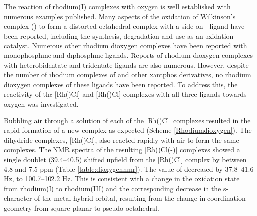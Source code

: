 The reaction of rhodium(I) complexes with oxygen is well established with numerous examples published.\cite{Valentine1973, Choy1972}  Many aspects of the oxidation of Wilkinson's complex () to form a distorted octahedral complex with a side-on - ligand have been reported, including the synthesis\cite{Baird1966, Atlay1980}, degradation\cite{Atlay1983} and use as an oxidation catalyst.\cite{Carlton1983, Read1985}  Numerous other rhodium dioxygen complexes have been reported with monophosphine \cite{Ahijado2005, Aresta1987, Bennett1977, Busetto1977, Gaal1977, Richter2000, Selke1993, Selke1995, Teets2012, Wakatsuki1990} and diphosphine\cite{Banwell2003, James1980,  Mague1977, McGinnety1969, Miller1975, Morvillo1986, Pettinari2002, Slack1979} ligands.  Reports of rhodium dioxygen complexes with heterobidentate\cite{Kashiwabara1997, Lindner1993, Perera1995, Yu2006} and tridentate\cite{Doux2003, Frech2006, Hayashi2013, Lanci2006, Vasapollo1981, Verat2008, Vigalok1996} ligands are also numerous.  However, despite the number of rhodium complexes of \Phxantphos{} and other xantphos derivatives, no rhodium dioxygen complexes of these ligands have been reported.  To address this, the reactivity of 
the [Rh(\tBuxantphos)Cl] and [Rh(\tBuxantphos)Cl] complexes with all three ligands towards oxygen was investigated.  

Bubbling air through a  solution of each of the [Rh(\tBuxantphosk)Cl] complexes resulted in the rapid formation of a new complex as expected (Scheme \ref{Rhodiumdioxygen}).  The dihydride complexes, [Rh(\tBuxantphosk)Cl], also reacted rapidly with air to form the same complexes.  The \phosphorus{} NMR spectra of the resulting [Rh(\tBuxantphos)Cl(-)] complexes showed a single doublet (39.4--40.5) shifted upfield from the [Rh(\tBuxantphos)Cl] complex by between 4.8 and 7.5 ppm (Table \ref{table:dioxygennmr}).  The value of \JRhP{} decreased by 37.8--41.6 Hz, to 100.7--102.2 Hz.  This is consistent with a change in the oxidation state from rhodium(I) to rhodium(III) and the corresponding decrease in the s-character of the metal hybrid orbital, resulting from the change in coordination geometry from square planar to pseudo-octahedral.  


